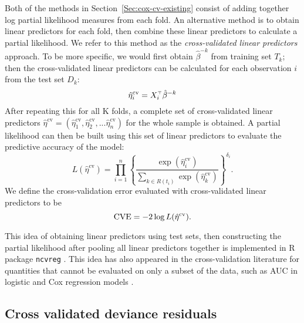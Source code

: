 \par Both of the methods in Section~\ref{Sec:cox-cv-existing} consist of adding together log partial likelihood measures from each fold.  An alternative method is to obtain linear predictors for each fold, then combine these linear predictors to calculate a partial likelihood. We refer to this method as the \emph{cross-validated linear predictors} approach. To be more specific, we would first obtain $\hat{\beta}^{-k}$ from training set $T_{k}$; then the cross-validated linear predictors can be calculated for each observation $i$ from the test set $D_k$:  
\begin{equation}
  \label{eq:cv-lp}
  \hat{\eta}^{\text{cv}}_{i} = X_{i}^{\scriptscriptstyle\top}\hat{\beta}^{-k}
\end{equation} 
After repeating this for all K folds, a complete set of cross-validated linear predictors $\hat{\eta}^{\text{cv}} = ( \hat{\eta}^{\text{cv}}_{1},  \hat{\eta}^{\text{cv}}_{2} , ...  \hat{\eta}^{\text{cv}}_{n})$ for the whole sample is obtained. A partial likelihood can then be built using this set of linear predictors to evaluate the predictive accuracy of the model:
\begin{equation*}
  L(\hat{\eta}^{\text{cv}}) = \prod_{i=1}^{n} \left\{ \frac{\exp (\hat{\eta}^{\text{cv}}_{i})}{\sum_{k \in R(t_{i})}\exp (\hat{\eta}^{\text{cv}}_k)} \right\} ^{\delta_i}.
\end{equation*}
We define the cross-validation error evaluated with cross-validated linear predictors to be $$\textrm{CVE} = - 2 \log L(\hat{\eta}^{\text{cv}}).$$
  
\par This idea of obtaining linear predictors using test sets, then constructing the partial likelihood after pooling all linear predictors together is implemented in R package \texttt{ncvreg} \citep{ncvreg}. This idea has also appeared in the cross-validation literature for quantities that cannot be evaluated on only a subset of the data, such as AUC in logistic and Cox regression models \citep{Parker2007,Simon2011a,Subramanian2011}.

\subsection{Cross validated deviance residuals}


